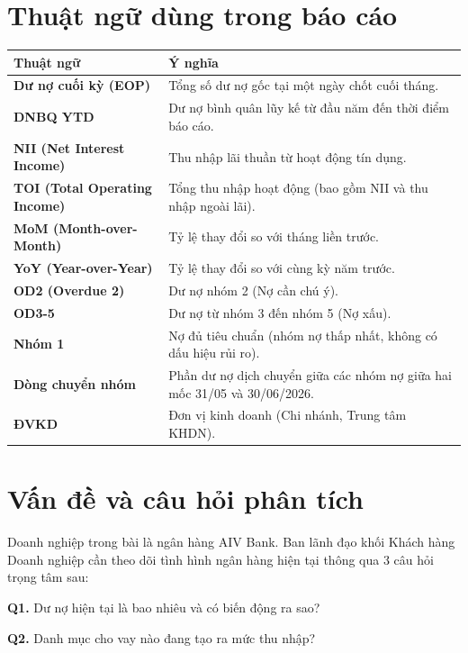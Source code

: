\documentclass[12pt]{eDA_conquer2026}
\begin{document}
\section*{Thuật ngữ dùng trong báo cáo}
\begin{table}[H]
\centering
\renewcommand{\arraystretch}{1.3}
\begin{tabularx}{\linewidth}{@{} >{\bfseries}p{4.5cm} X @{}}
\toprule
Thuật ngữ & Ý nghĩa \\
\midrule
Dư nợ cuối kỳ (EOP) & Tổng số dư nợ gốc tại một ngày chốt cuối tháng. \\
DNBQ YTD & Dư nợ bình quân lũy kế từ đầu năm đến thời điểm báo cáo. \\
NII (Net Interest Income) & Thu nhập lãi thuần từ hoạt động tín dụng. \\
TOI (Total Operating Income) & Tổng thu nhập hoạt động (bao gồm NII và thu nhập ngoài lãi). \\
MoM (Month-over-Month) & Tỷ lệ thay đổi so với tháng liền trước. \\
YoY (Year-over-Year) & Tỷ lệ thay đổi so với cùng kỳ năm trước. \\
OD2 (Overdue 2) & Dư nợ nhóm 2 (Nợ cần chú ý). \\
OD3-5 & Dư nợ từ nhóm 3 đến nhóm 5 (Nợ xấu). \\
Nhóm 1 & Nợ đủ tiêu chuẩn (nhóm nợ thấp nhất, không có dấu hiệu rủi ro). \\
Dòng chuyển nhóm & Phần dư nợ dịch chuyển giữa các nhóm nợ giữa hai mốc 31/05 và 30/06/2026. \\
ĐVKD & Đơn vị kinh doanh (Chi nhánh, Trung tâm KHDN). \\
\bottomrule
\end{tabularx}
\end{table}

\section{Vấn đề và câu hỏi phân tích}

Doanh nghiệp trong bài là ngân hàng AIV Bank. Ban lãnh đạo khối Khách hàng Doanh nghiệp cần theo dõi tình hình ngân hàng hiện tại thông qua 3 câu hỏi trọng tâm sau:

\vspace{0.2cm}
\noindent \textbf{Q1.} Dư nợ hiện tại là bao nhiêu và có biến động ra sao?

\noindent \textbf{Q2.} Danh mục cho vay nào đang tạo ra mức thu nhập?
\end{document}
